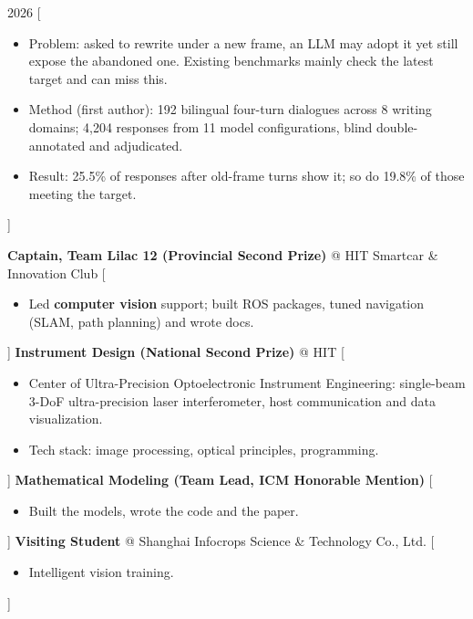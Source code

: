 \documentclass{resume}
\begin{document}
\begin{experiences}
  \experience%
    {2026}%
    { \hfill
     }%
    [\begin{itemize}
      \item Problem: asked to rewrite under a new frame, an LLM may adopt it yet still expose the abandoned one. Existing benchmarks mainly check the latest target and can miss this.
      \item Method (first author): 192 bilingual four-turn dialogues across 8 writing domains; 4,204 responses from 11 model configurations, blind double-annotated and adjudicated.
      \item Result:  25.5\% of responses after old-frame turns show it; so do 19.8\% of those meeting the target.
    \end{itemize}]
\end{experiences}

\begin{experiences}
    {\textbf{Captain, Team Lilac 12 (Provincial Second Prize)} @ HIT Smartcar \& Innovation Club}%
    [\begin{itemize}
      \item Led \textbf{computer vision} support; built ROS packages, tuned navigation (SLAM, path planning) and wrote docs.
    \end{itemize}]
  \separator{0.5ex}
    {\textbf{Instrument Design (National Second Prize)} @ HIT}%
    [\begin{itemize}
      \item Center of Ultra-Precision Optoelectronic Instrument Engineering: single-beam 3-DoF ultra-precision laser interferometer, host communication and data visualization.
      \item Tech stack: image processing, optical principles, programming.
    \end{itemize}]
  \separator{0.5ex}
    {\textbf{Mathematical Modeling (Team Lead, ICM Honorable Mention)}}%
    [\begin{itemize}
      \item Built the models, wrote the code and the paper.
    \end{itemize}]
  \separator{0.5ex}
    {\textbf{Visiting Student} @ Shanghai Infocrops Science \& Technology Co., Ltd.}%
    [\begin{itemize}
      \item Intelligent vision training.
    \end{itemize}]
\end{experiences}
\clearpage
\end{document}
